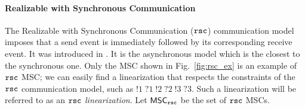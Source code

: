 \paragraph{\bf Realizable with Synchronous Communication}
The Realizable with Synchronous Communication ($\mathtt{rsc}$) communication model imposes that a send event is  immediately followed by its corresponding receive event. It was introduced in \cite{DBLP:journals/dc/Charron-BostMT96}. It is the asynchronous model which is the  closest to the synchronous one. %
Only the MSC shown in Fig.~\ref{fig:rsc_ex} is an example of $\mathtt{rsc}$ MSC; we can easily find a linearization that respects the constraints of the $\mathtt{rsc}$ communication model, such as $!1\;?1\;!2\;?2\;!3\;?3$. Such a linearization will be referred to as an \emph{$\mathtt{rsc}$ linearization}. Let $\mathsf{MSC}_{\mathtt{rsc}}$ be the set of $\mathtt{rsc}$ MSCs.



